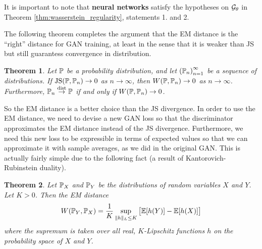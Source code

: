\documentclass{article}
\newtheorem{theorem}{Theorem}
\begin{document}
	It is important to note that \textbf{neural networks} satisfy the hypotheses on \(\mathcal{G}_{\theta}\) in Theorem \ref{thm:wasserstein_regularity}, statements 1. and 2.
	
	The following theorem completes the argument that the EM distance is the ``right'' distance for GAN training, at least in the sense that it is weaker than JS but still guarantess convergence in distribution.
	
	\begin{theorem}\label{thm:wasserstein_weakness}
		\cite{WGAN}
		Let \(\mathbb{P}\) be a probability distribution, and let \(\left(\mathbb{P}_n\right)_{n=1}^\infty\) be a sequence of distributions. If \(\mathrm{JS}(\mathbb{P}, \mathbb{P}_n) \to 0\) as \(n \to\infty\), then \(W(\mathbb{P}, \mathbb{P}_n) \to 0\) as \(n\to\infty\). Furthermore, \(\mathbb{P}_n \overset{\textnormal{dist}}{\to} \mathbb{P}\) if and only if \(W(\mathbb{P}, \mathbb{P}_n)\to 0\).
	\end{theorem}

	So the EM distance is a better choice than the JS divergence. In order to use the EM distance, we need to devise a new GAN loss so that the discriminator approximates the EM distance instead of the JS divergence. Furthermore, we need this new loss to be expressible in terms of expected values so that we can approximate it with sample averages, as we did in the original GAN. This is actually fairly simple due to the following fact (a result of Kantorovich-Rubinstein duality).
	
	\begin{theorem}\label{thm:wasserstein_duality}
		\cite{WGAN}
		Let \(\mathbb{P}_X\) and \(\mathbb{P}_Y\) be the distributions of random variables \(X\) and \(Y\). Let \(K > 0\). Then the EM distance
		\begin{equation}\label{eq:wasserstein_duality}
			W(\mathbb{P}_Y, \mathbb{P}_X) = \frac{1}{K}\sup_{\lVert h \rVert_L \le K} \big[\mathbb{E}[h(Y)] - \mathbb{E}[h(X)]\big]
		\end{equation}
		where the supremum is taken over all real, \(K\)-Lipschitz functions \(h\) on the probability space of \(X\) and \(Y\).
	\end{theorem}
	
\end{document}
